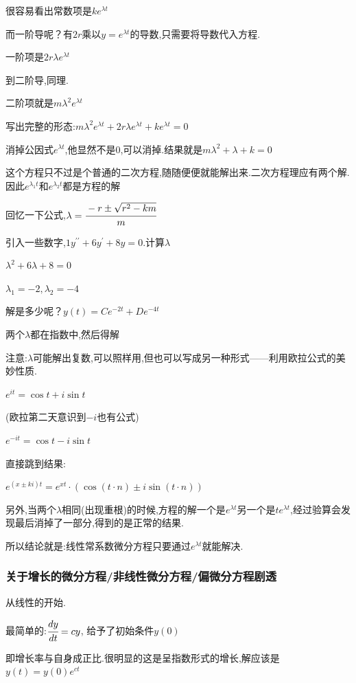 \documentclass[UTF8,12pt]{ctexbook}
\newcommand{\derivative}{^\prime}
\newcommand{\doubleDerivative}{^{\prime\prime}}
\begin{document}
{{{{很容易看出常数项是$ke^{\lambda t}$

而一阶导呢？有$2r$乘以$y = e^{\lambda t}$的导数,只需要将导数代入方程.

一阶项是$2r\lambda e^{\lambda t}$

到二阶导,同理.

二阶项就是$m\lambda^2e^{\lambda t}$

写出完整的形态:$m\lambda^2e^{\lambda t} + 2r\lambda e^{\lambda t} + ke^{\lambda t} = 0$

消掉公因式$e^{\lambda t}$,他显然不是0,可以消掉.结果就是$m\lambda^2 + \lambda + k= 0$

这个方程只不过是个普通的二次方程,随随便便就能解出来.二次方程理应有两个解.因此$e^{\lambda_1 t}$和$e^{\lambda_2 t}$都是方程的解

回忆一下公式,$\lambda = \cfrac{-r \pm \sqrt{r^2 - km}}{m}$

引入一些数字,$1y\doubleDerivative + 6y\derivative + 8y = 0$.计算$\lambda$

$\lambda^2 + 6\lambda + 8 = 0$

$\lambda_1 = -2, \lambda_2 = -4$

解是多少呢？$y(t) = Ce^{-2t} + De^{-4t}$

两个$\lambda$都在指数中,然后得解

注意:$\lambda$可能解出复数,可以照样用,但也可以写成另一种形式——利用欧拉公式的美妙性质.

$e^{it} = \cos t + i\sin t$

(欧拉第二天意识到$-i$也有公式)

$e^{-it} = \cos t -i\sin t$

直接跳到结果:

$e^{(x \pm ki)t} = e^{xt}\cdot(\cos(t\cdot n) \pm i\sin(t\cdot n))$

另外,当两个$\lambda$相同(出现重根)的时候,方程的解一个是$e^{\lambda t}$另一个是$te^{\lambda t}$,经过验算会发现最后消掉了一部分,得到的是正常的结果.

所以结论就是:线性常系数微分方程只要通过$e^{\lambda t}$就能解决.
}%

\subsubsection{关于增长的微分方程/非线性微分方程/偏微分方程剧透}{
  从线性的开始.

  最简单的:$\cfrac{dy}{dt} = cy$, 给予了初始条件$y(0)$

  即增长率与自身成正比.很明显的这是呈指数形式的增长,解应该是$y(t) = y(0)e^{ct}$

}}}}
\end{document}
